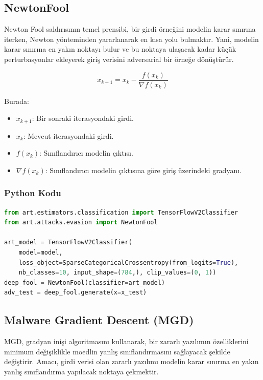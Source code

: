 \newpage

\subsection{NewtonFool}

Newton Fool saldırısının temel prensibi, bir girdi örneğini modelin karar sınırına iterken, Newton yönteminden yararlanarak en kısa yolu bulmaktır. Yani, modelin karar sınırına en yakın noktayı bulur ve bu noktaya ulaşacak kadar küçük perturbasyonlar ekleyerek giriş verisini adversarial bir örneğe dönüştürür.

\[ x_{k+1} = x_k - \frac{f(x_k)}{\nabla f(x_k)} \]

Burada:

\begin{itemize}
    \item $x_{k+1}$: Bir sonraki iterasyondaki girdi.
    \item $x_k$: Mevcut iterasyondaki girdi.
    \item $f(x_k)$: Sınıflandırıcı modelin çıktısı.
    \item $\nabla f(x_k)$: Sınıflandırıcı modelin çıktısına göre giriş üzerindeki gradyanı.
\end{itemize}

\subsubsection{Python Kodu}

\begin{lstlisting}[language=Python]
from art.estimators.classification import TensorFlowV2Classifier
from art.attacks.evasion import NewtonFool

art_model = TensorFlowV2Classifier(
    model=model, 
    loss_object=SparseCategoricalCrossentropy(from_logits=True), 
    nb_classes=10, input_shape=(784,), clip_values=(0, 1))
deep_fool = NewtonFool(classifier=art_model)
adv_test = deep_fool.generate(x=x_test)
\end{lstlisting}

\newpage

\subsection{Malware Gradient Descent (MGD)}

MGD, gradyan inişi algoritmasını kullanarak, bir zararlı yazılımın özelliklerini minimum değişiklikle moedlin yanlış sınıflandırmasını sağlayacak şekilde değiştirir. Amacı, girdi verisi olan zararlı yazılımı modelin karar sınırına en yakın yanlış sınıflandırma yapılacak noktaya çekmektir.

